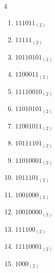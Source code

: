 \begin{multicols}{4}
\begin{enumerate}
        \phantom{$=174$}

  \item $111011_{(2)}$

        \phantom{$=59$}

\columnbreak %

\resetques

  \item $11111_{(2)}$

        \phantom{$=31$}

  \item $10110101_{(2)}$

        \phantom{$=181$}

  \item $1100011_{(2)}$

        \phantom{$=99$}

  \item $11110010_{(2)}$

        \phantom{$=242$}

  \item $11010101_{(2)}$

        \phantom{$=213$}

  \item $11001011_{(2)}$

        \phantom{$=203$}

  \item $10111101_{(2)}$

        \phantom{$=189$}

  \item $11010001_{(2)}$

        \phantom{$=209$}

  \item $1011101_{(2)}$

        \phantom{$=93$}

  \item $1001000_{(2)}$

        \phantom{$=72$}

  \item $10010000_{(2)}$

        \phantom{$=144$}

  \item $111100_{(2)}$

        \phantom{$=60$}

  \item $11110001_{(2)}$

        \phantom{$=241$}

  \item $1000_{(2)}$


\end{enumerate}
\end{multicols}
